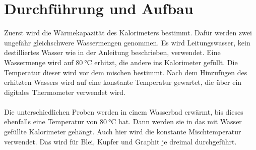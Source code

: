 \section{Durchführung und Aufbau}
\label{sec:Durchführung}
Zuerst wird die Wärmekapazität des Kalorimeters bestimmt.
Dafür werden zwei ungefähr gleichschwere Wassermengen genommen.
Es wird Leitungswasser, kein destilliertes Wasser wie in der Anleitung
\cite{Anleitung} beschrieben, verwendet.
Eine Wassermenge wird auf $\SI{80}{\celsius}$ erhitzt, die andere ins
Kalorimeter gefüllt. Die Temperatur dieser wird vor dem mischen bestimmt.
Nach dem Hinzufügen des erhitzten Wassers wird auf eine konstante Temperatur
gewartet, die über ein digitales Thermometer verwendet wird.
\\\\
Die unterschiedlichen Proben werden in einem Wasserbad erwärmt, bis dieses ebenfalls
eine Temperatur von $\SI{80}{\celsius}$ hat. Dann werden sie in das mit Wasser
gefüllte Kalorimeter gehängt. Auch hier wird die konstante Mischtemperatur
verwendet. Das wird für Blei, Kupfer und Graphit je dreimal durchgeführt.
